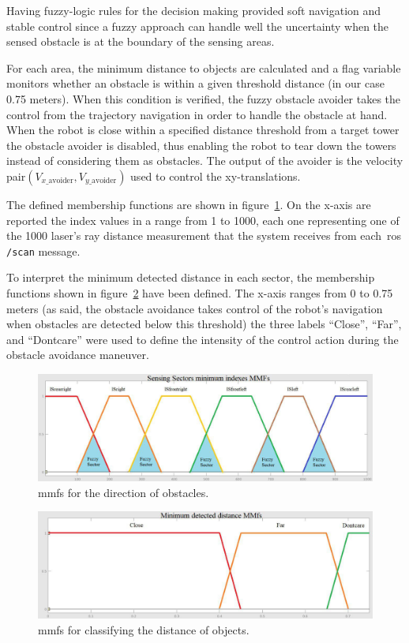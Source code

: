 Having fuzzy-logic rules for the decision making provided soft navigation and stable control since a fuzzy approach can handle well the uncertainty when the sensed obstacle is at the boundary of the sensing areas. 

For each area, the minimum distance to objects are calculated and a flag variable monitors whether an obstacle is within a given threshold distance (in our case 0.75 meters). When this condition is verified, the fuzzy obstacle avoider takes the control from the trajectory navigation in order to handle the obstacle at hand. When the robot is close within a specified distance threshold from a target tower the obstacle avoider is disabled, thus enabling the robot to tear down the towers instead of considering them as obstacles. The output of the avoider is the velocity pair$(V_{x\_\text{avoider}}, V_{y\_ \text{avoider}})$ used to control the xy-translations.

The defined membership functions are shown in figure~\ref{fig:indexesmmf}. On the x-axis are reported the index values in a range from 1 to 1000, each one representing one of the 1000 laser's ray distance measurement that the system receives from each~\gls{ros} \verb|/scan| message.

To interpret the minimum detected distance in each sector, the membership functions shown in figure~\ref{fig:minmmf} have been defined. The x-axis ranges from 0 to 0.75 meters (as said, the obstacle avoidance takes control of the robot's navigation when obstacles are detected below this threshold) the three labels ``Close'', ``Far'', and ``Dontcare'' were used to define the intensity of the control action during the obstacle avoidance maneuver.

\begin{figure}[H]
	\centering
	\includegraphics[width=\textwidth]{images/03-foundation/indexesmmf}
	\caption{\glspl{mmf} for the direction of obstacles.} 
	\label{fig:indexesmmf} 
\end{figure}
\begin{figure}[H]
	\centering
	\includegraphics[width=\textwidth]{images/03-foundation/minmmf}
	\caption{\glspl{mmf} for classifying the distance of objects.}
	\label{fig:minmmf} 
\end{figure}

